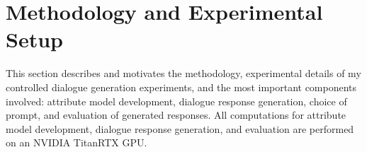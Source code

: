 \section{Methodology and Experimental Setup}
\label{sec:exp2_methods}


This section describes and motivates the methodology, experimental details of my controlled dialogue generation experiments, and the most important components involved: attribute model development, dialogue response generation, choice of prompt, and evaluation of generated responses. All computations for attribute model development, dialogue response generation, and evaluation are performed on an NVIDIA TitanRTX GPU.





